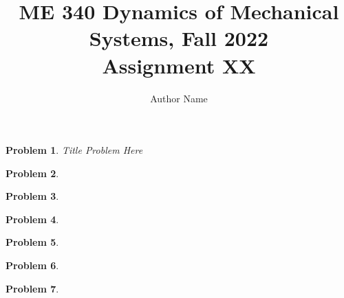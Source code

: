 \documentclass[]{article}
\title{ME 340 Dynamics of Mechanical Systems, Fall 2022 \\ Assignment XX}
\author{Author Name}
\newtheorem{problem}{Problem}
\begin{document}
\date{}
\maketitle{}

\begin{problem}
Title Problem Here
\end{problem}

\begin{problem}

\end{problem}

\begin{problem}

\end{problem}

\begin{problem}

\end{problem}


\begin{problem}

\end{problem}



\begin{problem}

\end{problem}



\begin{problem}

\end{problem}



\end{document}
